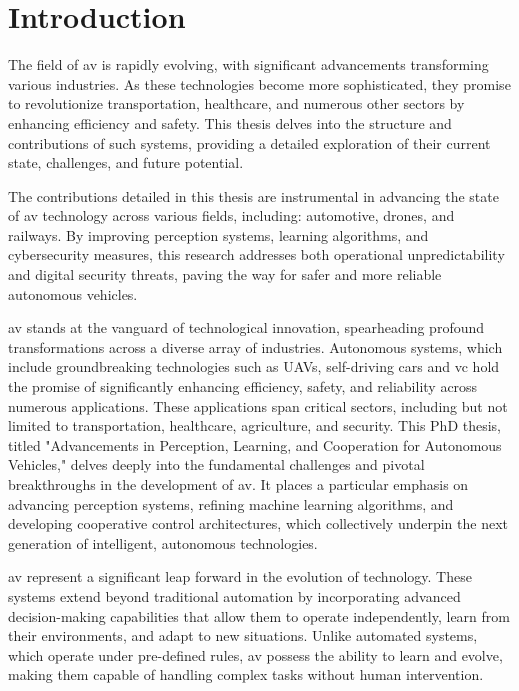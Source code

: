 \chapter{Introduction}
\label{Chapter: 1}

The field of \gls{av} is rapidly evolving, with significant advancements transforming various industries. As these technologies become more sophisticated, they promise to revolutionize transportation, healthcare, and numerous other sectors by enhancing efficiency and safety. This thesis delves into the structure and contributions of such systems, providing a detailed exploration of their current state, challenges, and future potential.



The contributions detailed in this thesis are instrumental in advancing the state of \gls{av} technology across various fields, including: automotive, drones, and railways. By improving perception systems, learning algorithms, and cybersecurity measures, this research addresses both operational unpredictability and digital security threats, paving the way for safer and more reliable autonomous vehicles. 

\gls{av} stands at the vanguard of technological innovation, spearheading profound transformations across a diverse array of industries. Autonomous systems, which include groundbreaking technologies such as \glspl{UAV}, self-driving cars and \gls{vc} hold the promise of significantly enhancing efficiency, safety, and reliability across numerous applications. These applications span critical sectors, including but not limited to transportation, healthcare, agriculture, and security. This PhD thesis, titled "Advancements in Perception, Learning, and Cooperation for Autonomous Vehicles," delves deeply into the fundamental challenges and pivotal breakthroughs in the development of \gls{av}. It places a particular emphasis on advancing perception systems, refining machine learning algorithms, and developing cooperative control architectures, which collectively underpin the next generation of intelligent, autonomous technologies.

\gls{av} represent a significant leap forward in the evolution of technology. These systems extend beyond traditional automation by incorporating advanced decision-making capabilities that allow them to operate independently, learn from their environments, and adapt to new situations. Unlike automated systems, which operate under pre-defined rules, \gls{av} possess the ability to learn and evolve, making them capable of handling complex tasks without human intervention.

